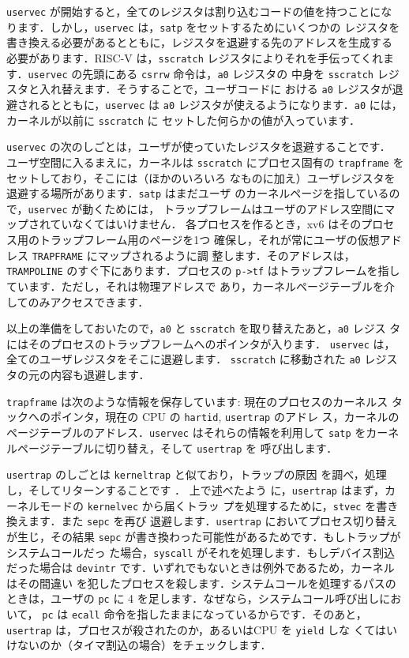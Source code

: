 \texttt{uservec} が開始すると，全てのレジスタは割り込むコードの値を持つことにな
ります．しかし，\texttt{uservec} は，\texttt{satp} をセットするためにいくつかの
レジスタを書き換える必要があるとともに，レジスタを退避する先のアドレスを生成する
必要があります．RISC-V は，\texttt{sscratch} レジスタによりそれを手伝ってくれま
す．\texttt{uservec} の先頭にある \texttt{csrrw} 命令は，\texttt{a0} レジスタの
中身を \texttt{sscratch} レジスタと入れ替えます．そうすることで，ユーザコードに
おける \texttt{a0} レジスタが退避されるとともに，\texttt{uservec} は \texttt{a0}
レジスタが使えるようになります．\texttt{a0} には，カーネルが以前に \texttt{sscratch} に
セットした何らかの値が入っています．

\texttt{uservec} の次のしごとは，ユーザが使っていたレジスタを退避することです．
ユーザ空間に入るまえに，カーネルは \texttt{sscratch} にプロセス固有の
\texttt{trapframe} 
をセットしており，そこには（ほかのいろいろ
なものに加え）ユーザレジスタを退避する場所があります．\texttt{satp} はまだユーザ
のカーネルページを指しているので，\texttt{uservec} が動くためには，
トラップフレームはユーザのアドレス空間にマップされていなくてはいけません．
各プロセスを作るとき，xv6 はそのプロセス用のトラップフレーム用のページを1つ
確保し，それが常にユーザの仮想アドレス \texttt{TRAPFRAME} にマップされるように調
整します．そのアドレスは，\texttt{TRAMPOLINE} のすぐ下にあります．プロセスの
\texttt{p->tf} はトラップフレームを指しています．ただし，それは物理アドレスで
あり，カーネルページテーブルを介してのみアクセスできます．

以上の準備をしておいたので，\texttt{a0} と \texttt{sscratch} を取り替えたあと，\texttt{a0} レジス
タにはそのプロセスのトラップフレームへのポインタが入ります．
\texttt{uservec} は，全てのユーザレジスタをそこに退避します．
\texttt{{sscratch}} に移動された \texttt{a0} レジスタの元の内容も退避します．

\texttt{trapframe} は次のような情報を保存しています: 現在のプロセスのカーネルス
タックへのポインタ，現在の CPU の \texttt{hartid}, \texttt{usertrap} のアドレ
ス，カーネルのページテーブルのアドレス．\texttt{uservec} はそれらの情報を利用して
\texttt{satp} をカーネルページテーブルに切り替え，そして \texttt{usertrap} を
呼び出します．

\texttt{usertrap} のしごとは \texttt{kerneltrap} と似ており，トラップの原因
を調べ，処理し，そしてリターンすることです ．
上で述べたよう
に，\texttt{usertrap} はまず，カーネルモードの \texttt{kernelvec} から届くトラッ
プを処理するために，\texttt{stvec} を書き換えます．また \texttt{sepc} を再び
退避します．\texttt{usertrap} においてプロセス切り替えが生じ，その結果
\texttt{sepc} が書き換わった可能性があるためです．もしトラップがシステムコールだっ
た場合，\texttt{syscall} がそれを処理します．もしデバイス割込だった場合は
\texttt{devintr} です．いずれでもないときは例外であるため，カーネルはその間違い
を犯したプロセスを殺します．システムコールを処理するパスのときは，ユーザの
\texttt{pc} に 4 を足します．なぜなら，システムコール呼び出しにおいて，
\texttt{pc} は \texttt{ecall} 命令を指したままになっているからです．そのあと，
\texttt{usertrap} は，プロセスが殺されたのか，あるいはCPU を \texttt{yield} しな
くてはいけないのか（タイマ割込の場合）をチェックします．

